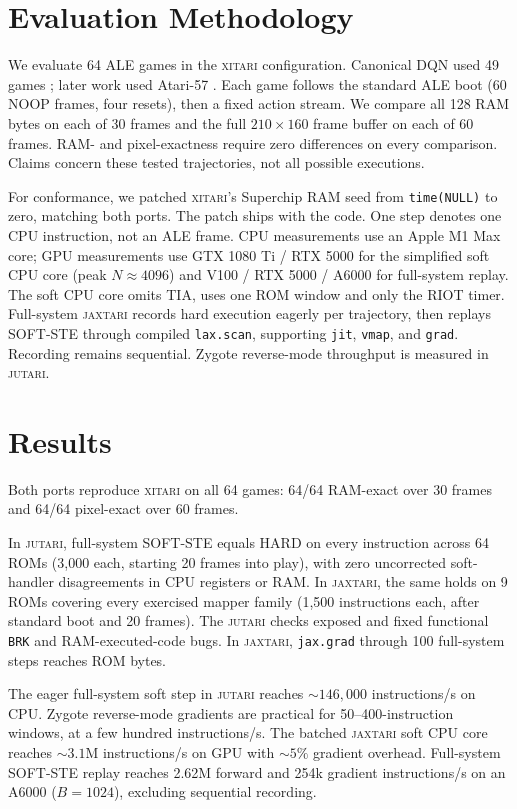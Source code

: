 \documentclass[letterpaper]{article} %
\begin{document}
\section{Evaluation Methodology}

We evaluate 64 ALE games in the \textsc{xitari}
configuration. Canonical DQN used 49 games
\citep{mnih2015human}; later work used Atari-57
\citep{machado2018revisiting}. Each game follows the
standard ALE boot (60 NOOP frames, four resets),
then a fixed action stream. We compare all 128 RAM
bytes on each of 30 frames and the full
$210\times160$ frame buffer on each of 60 frames.
RAM- and pixel-exactness require zero differences
on every comparison. Claims concern these tested
trajectories, not all possible executions.

For conformance, we patched \textsc{xitari}'s
Superchip RAM seed from \texttt{time(NULL)} to zero,
matching both ports. The patch ships with the code.
One step denotes one CPU instruction, not an ALE frame.
CPU measurements use an Apple M1 Max core; GPU measurements
use GTX 1080 Ti / RTX 5000 for the simplified soft CPU
core (peak $N\approx4096$) and V100 / RTX 5000 / A6000
for full-system replay. The soft CPU core omits TIA,
uses one ROM window and only the RIOT timer.
Full-system \textsc{jaxtari} records hard execution
eagerly per trajectory, then replays SOFT-STE through
compiled \texttt{lax.scan}, supporting \texttt{jit},
\texttt{vmap}, and \texttt{grad}. Recording remains
sequential. Zygote reverse-mode throughput is measured
in \textsc{jutari}.

\section{Results}

Both ports reproduce \textsc{xitari} on all 64 games:
64/64 RAM-exact over 30 frames and 64/64 pixel-exact
over 60 frames.

In \textsc{jutari}, full-system SOFT-STE equals HARD
on every instruction across 64 ROMs (3,000 each,
starting 20 frames into play), with zero uncorrected
soft-handler disagreements in CPU registers or RAM.
In \textsc{jaxtari}, the same holds on 9 ROMs
covering every exercised mapper family (1,500
instructions each, after standard boot and 20 frames).
The \textsc{jutari} checks exposed and fixed functional
\texttt{BRK} and RAM-executed-code bugs. In \textsc{jaxtari},
\texttt{jax.grad} through 100 full-system steps
reaches ROM bytes.

The eager full-system soft step in \textsc{jutari}
reaches ${\sim}146{,}000$ instructions/s on CPU.
Zygote reverse-mode gradients are practical for
50--400-instruction windows, at a few hundred
instructions/s. The batched \textsc{jaxtari} soft CPU
core reaches ${\sim}3.1$M instructions/s on GPU with
${\sim}5\%$ gradient overhead. Full-system SOFT-STE
replay reaches 2.62M forward and 254k gradient
instructions/s on an A6000 ($B=1024$), excluding
sequential recording.
\end{document}
